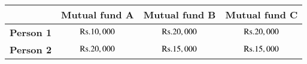 \begin{table}[h!]
\centering
\begin{tabular}{|c|c|c|c|}
\hline
                & \textbf{Mutual fund A} & \textbf{Mutual fund B} & \textbf{Mutual fund C} \\ \hline
\textbf{Person 1} & \(\text{Rs.} 10,000\)          & \(\text{Rs.} 20,000\)          & \(\text{Rs.} 20,000\)          \\ \hline
\textbf{Person 2} & \(\text{Rs.} 20,000\)          & \(\text{Rs.} 15,000\)          & \(\text{Rs.} 15,000\)          \\ \hline
\end{tabular}
\end{table}
